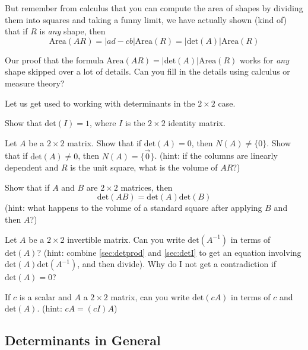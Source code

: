 But remember from calculus that you can compute the area of shapes by dividing them into squares and taking a funny limit, we have actually shown (kind of) that if $R$ is \emph{any} shape, then
\[\mbox{Area}(AR) = |ad-cb|\mbox{Area}(R) = \left|\mbox{det}(A)\right|\mbox{Area}(R)\]
\begin{TrickyEx}[optional]
  Our proof that the formula $\mbox{Area}(AR) = \left|\mbox{det}(A)\right|\mbox{Area}(R)$ works for \emph{any} shape skipped over a lot of details.  
  Can you fill in the details using calculus or measure theory?
\end{TrickyEx}

Let us get used to working with determinants in the $2\times 2$ case.  

\begin{EasyEx}
  \label{sec:detfirst}
  \label{sec:detI}
  Show that $\mbox{det}(I)=1$, where $I$ is the $2\times 2$ identity matrix.
\end{EasyEx} 

\begin{Ex}
  \label{sec:det0}
  Let $A$ be a $2\times 2$ matrix.
  Show that if $\mbox{det}(A)=0$, then $N(A)\ne \{0\}$.  
  Show that if $\mbox{det}(A)\ne0$, then $N(A)=\{\vec{0}\}$.  
  (hint: if the columns are linearly dependent and $R$ is the unit square, what is the volume of $AR$?)
\end{Ex}

\begin{ImpEx}
  \label{sec:detprod}
  Show that if $A$ and $B$ are $2\times 2$ matrices, then 
  \[\mbox{det}(AB)=\mbox{det}(A)\mbox{det}(B)\]
  (hint: what happens to the volume of a standard square after applying $B$ and then $A$?)
\end{ImpEx}

\begin{Ex}
  Let $A$ be a $2\times 2$ invertible matrix.
  Can you write $\mbox{det}(A^{-1})$ in terms of $\mbox{det}(A)$?
  (hint: combine \ref{sec:detprod} and \ref{sec:detI} to get an equation involving $\mbox{det}(A)\mbox{det}(A^{-1})$, and then divide).
  Why do I not get a contradiction if $\mbox{det}(A)=0$?
\end{Ex}

\begin{Ex}
  \label{sec:detlast}
  If $c$ is a scalar and $A$ a $2\times 2$ matrix,
  can you write $\mbox{det}(cA)$ in terms of $c$ and $\mbox{det}(A)$.
  (hint: $cA=(cI)A$)
\end{Ex}

\subsection{Determinants in General}

